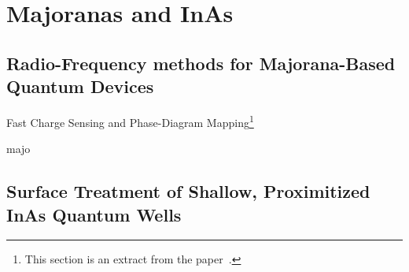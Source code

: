 \chapter{Majoranas and InAs}
\label{sec:majoinas}

\clearpage
\section{Radio-Frequency methods for {Majorana-Based} {Quantum} {Devices}}
{\large \bf \begin{center}Fast Charge Sensing and Phase-Diagram Mapping\footnote{
    This section is an extract from the paper~\cite{PhysRevApplied.11.064011}.
}\end{center}}
\label{sec:rfmajo}
{majo}

\clearpage
\section{Surface Treatment of Shallow, Proximitized InAs Quantum Wells}
\label{sec:inas_hb}